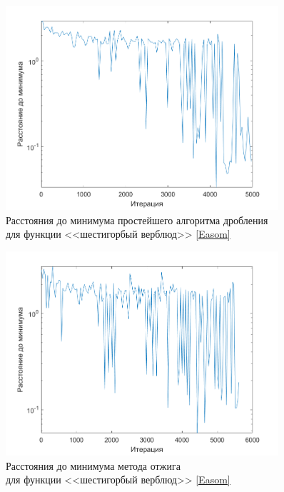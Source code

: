 \begin{figure}[H]
\centering
\includegraphics[width=0.9\textwidth]{Graphics/TrivialDivide_Camel_dist_to_min.png}
\caption{Расстояния до минимума простейшего алгоритма дробления\\ для функции <<шестигорбый верблюд>> \eqref{Easom}} 
\end{figure}
\begin{figure}[H]
\centering
\includegraphics[width=0.9\textwidth]{Graphics/SimAnnealing_Camel_dist_to_min.png}
\caption{Расстояния до минимума метода отжига\\ для функции <<шестигорбый верблюд>> \eqref{Easom}} 
\end{figure}